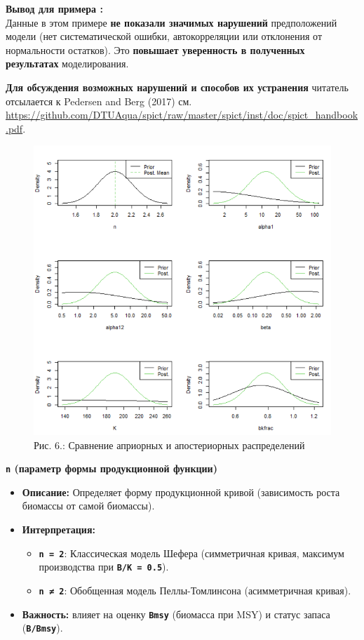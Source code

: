 \documentclass[
  letterpaper,
  DIV=11,
  numbers=noendperiod]{scrreprt}
\begin{document}
\textbf{Вывод для примера :}\\
Данные в этом примере \textbf{не показали значимых нарушений}
предположений модели (нет систематической ошибки, автокорреляции или
отклонения от нормальности остатков). Это \textbf{повышает уверенность в
полученных результатах} моделирования.

\textbf{Для обсуждения возможных нарушений и способов их устранения}
читатель отсылается к Pedersen and Berg (2017) см.
\url{https://github.com/DTUAqua/spict/raw/master/spict/inst/doc/spict_handbook.pdf}.

\begin{figure}[H]

{\centering \includegraphics[width=0.8\linewidth,height=\textheight,keepaspectratio]{images/SPICT6.PNG}

}

\caption{Рис. 6.: Сравнение априорных и апостериорных распределений}

\end{figure}%

\textbf{\texttt{n} (параметр формы продукционной функции)}

\begin{itemize}
\item
  \textbf{Описание:} Определяет форму продукционной кривой (зависимость
  роста биомассы от самой биомассы).
\item
  \textbf{Интерпретация:}

  \begin{itemize}
  \item
    \textbf{\texttt{n\ =\ 2}}: Классическая модель Шефера (симметричная
    кривая, максимум производства при \textbf{\texttt{B/K\ =\ 0.5}}).
  \item
    \textbf{\texttt{n\ ≠\ 2}}: Обобщенная модель Пеллы-Томлинсона
    (асимметричная кривая).
  \end{itemize}
\item
  \textbf{Важность:} влияет на оценку \textbf{\texttt{Bmsy}} (биомасса
  при MSY) и статус запаса (\textbf{\texttt{B/Bmsy}}).
\end{itemize}
\end{document}
